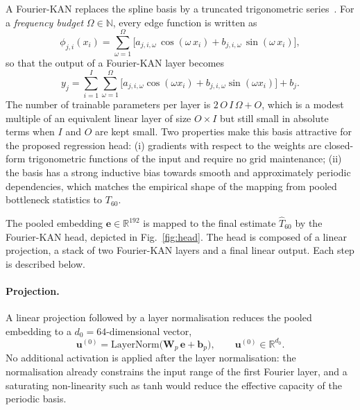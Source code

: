 \documentclass[a4paper,fleqn]{cas-sc}
\begin{document}
A Fourier-KAN replaces the spline basis by a truncated trigonometric
series~\citep{xu2025fourierkan, yang2025kanforspeech}. For a
\emph{frequency budget} $\Omega\in\mathbb{N}$, every edge function is
written as
\begin{equation}\label{eq:fourier_phi}
  \phi_{j,i}(x_i) = \sum_{\omega=1}^{\Omega}
    \bigl[a_{j,i,\omega}\,\cos(\omega\,x_i)
        + b_{j,i,\omega}\,\sin(\omega\,x_i)\bigr],
\end{equation}
so that the output of a Fourier-KAN layer becomes
\begin{equation}\label{eq:fourier_layer}
  y_j = \sum_{i=1}^{I}\sum_{\omega=1}^{\Omega}
        \bigl[a_{j,i,\omega}\cos(\omega x_i)
            + b_{j,i,\omega}\sin(\omega x_i)\bigr] + b_j.
\end{equation}
The number of trainable parameters per layer is $2\,O\,I\,\Omega + O$,
which is a modest multiple of an equivalent linear layer of size
$O\times I$ but still small in absolute terms when $I$ and $O$ are kept
small. Two properties make this basis attractive for the proposed
regression head: (i) gradients with respect to the weights are
closed-form trigonometric functions of the input and require no grid
maintenance; (ii) the basis has a strong inductive bias towards smooth
and approximately periodic dependencies, which matches the empirical
shape of the mapping from pooled bottleneck statistics to $T_{60}$.

The pooled embedding $\mathbf{e}\in\mathbb{R}^{192}$ is mapped to the
final estimate $\hat{T}_{60}$ by the Fourier-KAN head, depicted
in Fig.~\ref{fig:head}. The head is composed of a linear
projection, a stack of two Fourier-KAN layers and a final linear output.
Each step is described below.

\paragraph{Projection.} A linear projection followed by a layer
normalisation reduces the pooled embedding to a $d_{0}=64$-dimensional
vector,
\begin{equation}\label{eq:proj}
  \mathbf{u}^{(0)} = \mathrm{LayerNorm}\bigl(\mathbf{W}_{p}\,\mathbf{e}+
                                              \mathbf{b}_{p}\bigr),
  \qquad \mathbf{u}^{(0)}\in\mathbb{R}^{d_{0}}.
\end{equation}
No additional activation is applied after the layer normalisation:
the normalisation already constrains the input range of the first
Fourier layer, and a saturating non-linearity such as tanh would reduce
the effective capacity of the periodic basis.
\end{document}
